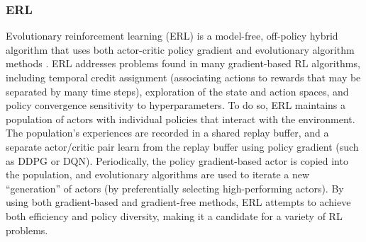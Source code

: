 \subsubsection{ERL}

Evolutionary reinforcement learning (ERL) is a model-free, off-policy hybrid algorithm that uses both actor-critic policy gradient and evolutionary algorithm methods \cite{khadka2018evolutionguided}. ERL addresses problems found in many  gradient-based RL algorithms, including temporal credit assignment (associating actions to rewards that may be separated by many time steps), exploration of the state and action spaces, and policy convergence sensitivity to hyperparameters. To do so, ERL maintains a population of actors with individual policies that interact with the environment. The population's experiences are recorded in a shared replay buffer, and a separate actor/critic pair learn from the replay buffer using policy gradient (such as DDPG or DQN). Periodically, the policy gradient-based actor is copied into the population, and evolutionary algorithms are used to iterate a new ``generation'' of actors (by preferentially selecting high-performing actors). By using both gradient-based and gradient-free methods, ERL attempts to achieve both efficiency and policy diversity, making it a candidate for a variety of RL problems.
